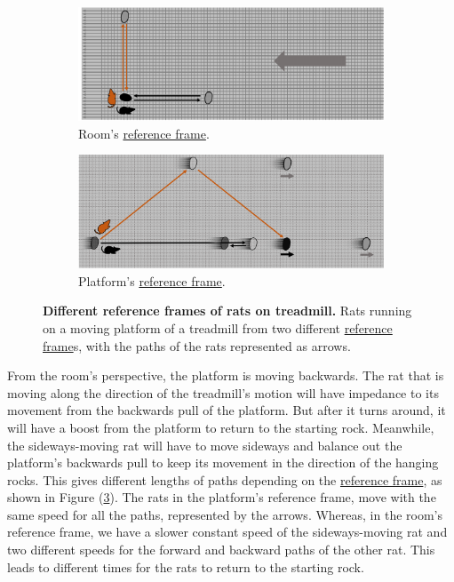 \begin{figure}[H]
	\centering
	\begin{subfigure}{0.9\textwidth}
		\centering
		\includegraphics[width = \textwidth]{images/pdf/rats_moving.pdf}
		\caption{Room's \protect\hyperlink{def-Reference-frame}{reference frame}.}
		\label{fig: rat with moving platform}
	\end{subfigure}
	\begin{subfigure}{0.9\textwidth}
		\vspace{0.2cm}
		\centering
		\includegraphics[width = \textwidth]{images/pdf/rats_platform_frame.pdf}
		\caption{Platform's \protect\hyperlink{def-Reference-frame}{reference frame}.}
		\label{fig: rat platform reference frame}
	\end{subfigure}
	\caption{\textbf{Different reference frames of rats on treadmill.} Rats running on a moving platform of a treadmill from two different \protect\hyperlink{def-Reference-frame}{reference frame}s, with the paths of the rats represented as arrows.}
	\label{fig: treadmill}
\end{figure}


From the room's perspective, the platform is moving backwards.
The rat that is moving along the direction of the treadmill's motion will have impedance to its movement from the backwards pull of the platform.
But after it turns around, it will have a boost from the platform to return to the starting rock.
Meanwhile, the sideways-moving rat will have to move sideways and balance out the platform's backwards pull to keep its movement in the direction of the hanging rocks.
This gives different lengths of paths depending on the \hyperlink{def-Reference-frame}{reference frame}, as shown in Figure (\ref{fig: treadmill}).
The rats in the platform's reference frame, move with the same speed for all the paths, represented by the arrows.
Whereas, in the room's reference frame, we have a slower constant speed of the sideways-moving rat and two different speeds for the forward and backward paths of the other rat.
This leads to different times for the rats to return to the starting rock.

